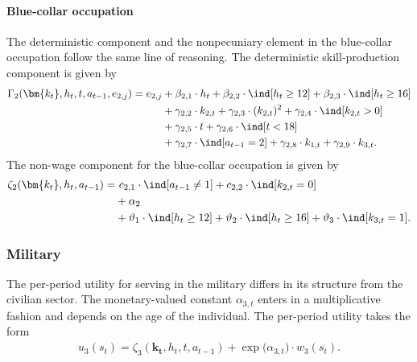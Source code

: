 \paragraph{Blue-collar occupation} The deterministic component and the nonpecuniary element in the blue-collar occupation follow the same line of reasoning. The deterministic skill-production component is given by
%
\begin{align*} 
    \Gamma_2(\bm{k_t}, h_t, t, a_{t-1}, e_{2,j}) = e_{2,j} & + \beta_{2,1} \cdot h_t + \beta_{2, 2} \cdot \ind[h_t \geq 12] + \beta_{2,3} \cdot \ind[h_t\geq 16] \\
    							 & + \gamma_{2, 2} \cdot  k_{2,t} + \gamma_{2,3} \cdot  (k_{2,t})^2 + \gamma_{2,4} \cdot  \ind[k_{2,t} > 0] \\
                                   & + \gamma_{2,5} \cdot  t + \gamma_{2,6} \cdot \ind[t < 18] \\
                                  & + \gamma_{2,7} \cdot  \ind[a_{t-1} = 2]  + \gamma_{2,8} \cdot  k_{1,t} + \gamma_{2,9} \cdot  k_{3,t}. 
\end{align*}
The non-wage component for the blue-collar occupation is given by
\begin{align*} 
\zeta_{2}( \bm{k_t}, h_t, a_{t-1} ) = &~c_{2,1} \cdot \ind[a_{t-1} \neq 1] + c_{2,2} \cdot \ind[k_{2,t} = 0] \\
                            & + \alpha_2 \\
                            & + \vartheta_1 \cdot \ind[h_t \geq 12] + \vartheta_2 \cdot \ind[h_t \geq 16] + \vartheta_3 \cdot \ind[k_{3,t} = 1].
\end{align*}


\FloatBarrier\subsubsection{Military}
The per-period utility for serving in the military differs in its structure from the civilian sector. The monetary-valued constant $\alpha_{3,t}$ enters in a multiplicative fashion and depends on the age of the individual. The per-period utility takes the form
%
\begin{align}\label{eq:RewardMilitary}
    u_{3}(s_t) = \zeta_3(\bm{k_t}, h_t, t , a_{t -1})  + \exp \big( \alpha_{3, t} \big) \cdot w_{3}(s_t).
\end{align}

